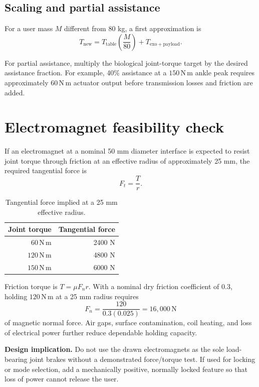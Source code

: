 \documentclass[11pt,a4paper]{article}
\newcommand{\unit}[1]{\ensuremath{\,\mathrm{#1}}}
\newcommand{\Nm}{\unit{N\,m}}
\newcommand{\highlightbox}[2]{%
  \begingroup
  \setlength{\fboxsep}{8pt}%
  \noindent\colorbox{#1}{\parbox{\dimexpr\linewidth-2\fboxsep\relax}{#2}}%
  \endgroup
}
\begin{document}
\subsection{Scaling and partial assistance}

For a user mass $M$ different from 80 kg, a first approximation is
\begin{equation}
T_{\mathrm{new}} = T_{\mathrm{table}}\left(\frac{M}{80}\right)
+T_{\mathrm{exo+payload}}.
\end{equation}

For partial assistance, multiply the biological joint-torque target by the desired assistance fraction. For example, 40\% assistance at a $150\Nm$ ankle peak requires approximately $60\Nm$ actuator output before transmission losses and friction are added.

\section{Electromagnet feasibility check}

If an electromagnet at a nominal 50 mm diameter interface is expected to resist joint torque through friction at an effective radius of approximately 25 mm, the required tangential force is
\begin{equation}
  F_t=\frac{T}{r}.
\end{equation}

\begin{table}[H]
\centering
\caption{Tangential force implied at a 25 mm effective radius.}
\begin{tabular}{@{}rr@{}}
\toprule
\textbf{Joint torque} & \textbf{Tangential force} \\
\midrule
$60\Nm$ & 2400 N \\
$120\Nm$ & 4800 N \\
$150\Nm$ & 6000 N \\
\bottomrule
\end{tabular}
\end{table}

Friction torque is $T=\mu F_n r$. With a nominal dry friction coefficient of 0.3, holding $120\Nm$ at a 25 mm radius requires
\begin{equation}
F_n=\frac{120}{0.3(0.025)}=\boxed{16{,}000\unit{N}}
\end{equation}
of magnetic normal force. Air gaps, surface contamination, coil heating, and loss of electrical power further reduce dependable holding capacity.

\highlightbox{Warm}{%
  \textbf{Design implication.} Do not use the drawn electromagnets as the sole load-bearing joint brakes without a demonstrated force/torque test. If used for locking or mode selection, add a mechanically positive, normally locked feature so that loss of power cannot release the user.
}
\end{document}
